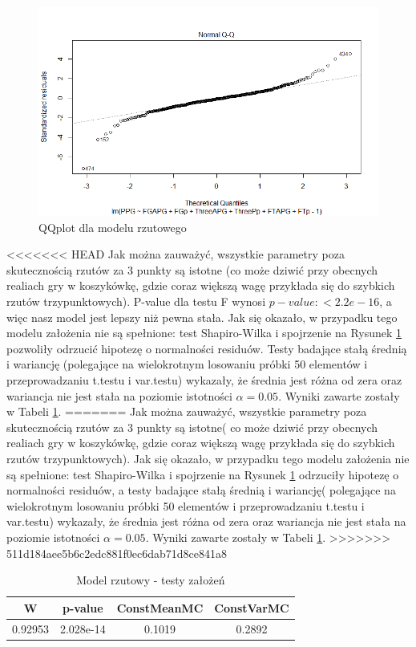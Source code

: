 \documentclass[11pt,a4paper]{article}
\begin{document}
\begin{figure}[t]
\includegraphics[width=\textwidth]{offense_2}
\caption{QQplot dla modelu rzutowego}
\label{qqplot_offense}
\centering
\end{figure}
<<<<<<< HEAD
Jak można zauważyć, wszystkie parametry poza skutecznością rzutów za 3 punkty są istotne (co może dziwić przy obecnych realiach gry w koszykówkę, gdzie coraz większą wagę przykłada się do szybkich rzutów trzypunktowych). P-value dla testu F wynosi $p-value: < 2.2e-16$, a więc nasz model jest lepszy niż pewna stała. Jak się okazało, w przypadku tego modelu założenia nie są spełnione: test Shapiro-Wilka i spojrzenie na Rysunek \ref{qqplot_offense} pozwoliły odrzucić hipotezę o normalności residuów. Testy badające stałą średnią i wariancję (polegające na wielokrotnym losowaniu próbki 50 elementów i przeprowadzaniu t.testu i var.testu) wykazały, że średnia jest różna od zera oraz wariancja nie jest stała na poziomie istotności $\alpha=0.05$. Wyniki zawarte zostały w Tabeli \ref{zalozenia_offense}.
=======
Jak można zauważyć, wszystkie parametry poza skutecznością rzutów za 3 punkty są istotne( co może dziwić przy obecnych realiach gry w koszykówkę, gdzie coraz większą wagę przykłada się do szybkich rzutów trzypunktowych). Jak się okazało, w przypadku tego modelu założenia nie są spełnione: test Shapiro-Wilka i spojrzenie na Rysunek \ref{qqplot_offense} odrzuciły hipotezę o normalności residuów, a testy badające stałą średnią i wariancję( polegające na wielokrotnym losowaniu próbki 50 elementów i przeprowadzaniu t.testu i var.testu) wykazały, że średnia jest różna od zera oraz wariancja nie jest stała na poziomie istotności $\alpha=0.05$. Wyniki zawarte zostały w Tabeli \ref{zalozenia_offense}.
>>>>>>> 511d184aee5b6c2edc881f0ec6dab71d8ce841a8
\begin{table}[H]
	\begin{center}
	\begin{tabular}{| c | c | c | c |}
		\hline
		W & p-value & ConstMeanMC & ConstVarMC\\ \hline
		0.92953 & 2.028e-14 & 0.1019 & 0.2892 \\ \hline
	\end{tabular}
	\caption{Model rzutowy - testy założeń}
	\label{zalozenia_offense}
	\end{center}
\end{table}
\end{document}
